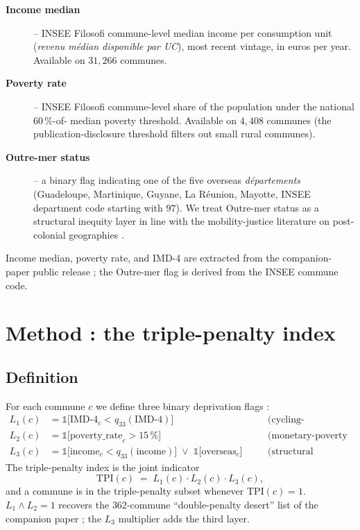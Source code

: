 \documentclass[11pt,a4paper]{article}
\newcommand{\IMD}{\mathrm{IMD}}
\newcommand{\TPI}{\mathrm{TPI}}
\begin{document}
\begin{description}
    \item[\textbf{Income median}] -- INSEE Filosofi commune-level
          median income per consumption unit (\emph{revenu m\'edian
          disponible par UC}), most recent vintage, in euros per
          year.  Available on $31{,}266$ communes.

    \item[\textbf{Poverty rate}] -- INSEE Filosofi commune-level
          share of the population under the national $60\,\%$-of-
          median poverty threshold.  Available on $4{,}408$ communes
          (the publication-disclosure threshold filters out small
          rural communes).

    \item[\textbf{Outre-mer status}] -- a binary flag indicating
          one of the five overseas \emph{d\'epartements}
          (Guadeloupe, Martinique, Guyane, La R\'eunion, Mayotte,
          INSEE department code starting with $97$).  We treat
          Outre-mer status as a structural inequity layer in line
          with the mobility-justice literature on post-colonial
          geographies \citep{Sheller2018}.
\end{description}

Income median, poverty rate, and IMD-4 are extracted from the
companion-paper public release ; the Outre-mer flag is derived
from the INSEE commune code.

\section{Method : the triple-penalty index}
\label{sec:method}

\subsection{Definition}

For each commune $c$ we define three binary deprivation flags :
\begin{align*}
    L_1(c) &= \mathbb{1}\big[\IMD\text{-}4_c < q_{33}(\IMD\text{-}4)\big]
              \quad &&\text{(cycling-environment deprivation)} \\
    L_2(c) &= \mathbb{1}\big[\text{poverty\_rate}_c > 15\,\%\big]
              \quad &&\text{(monetary-poverty exposure)} \\
    L_3(c) &= \mathbb{1}\big[\text{income}_c < q_{33}(\text{income})\big]
              \;\lor\; \mathbb{1}\big[\text{overseas}_c\big]
              \quad &&\text{(structural deprivation)}
\end{align*}
The triple-penalty index is the joint indicator
\[
    \TPI(c) \;=\; L_1(c) \cdot L_2(c) \cdot L_3(c),
\]
and a commune is in the triple-penalty subset whenever
$\TPI(c) = 1$.  $L_1 \land L_2 = 1$ recovers the
$362$-commune ``double-penalty desert'' list of the companion
paper ; the $L_3$ multiplier adds the third layer.
\end{document}

